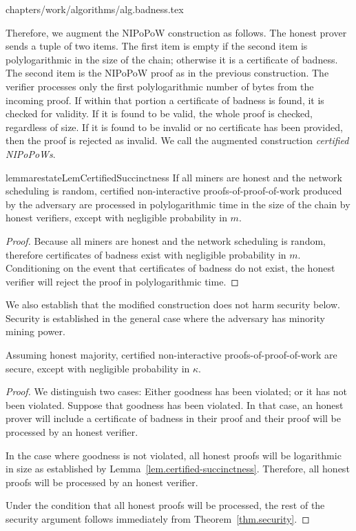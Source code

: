 {chapters/work/algorithms/alg.badness.tex}

Therefore, we augment the NIPoPoW construction as follows. The honest prover
sends a tuple of two items. The first item is empty if the second item is
polylogarithmic in the size of the chain; otherwise it is a certificate of
badness. The second item is the NIPoPoW proof as in the previous construction.
The verifier processes only the first polylogarithmic number of bytes from the
incoming proof. If within that portion a certificate of badness is found, it is
checked for validity. If it is found to be valid, the whole proof is checked,
regardless of size. If it is found to be invalid or no certificate has been
provided, then the proof is rejected as invalid. We call the augmented
construction \emph{certified NIPoPoWs}.

\begin{restatable}{lemma}{restateLemCertifiedSuccinctness}
    \label{lem.certified-succinctness}
    If all miners are honest and the network scheduling is random,
    certified non-interactive proofs-of-proof-of-work produced by the adversary
    are processed in polylogarithmic time in the size of the chain by honest
    verifiers, except with negligible probability in $m$.
\end{restatable}
\begin{proof}
    Because all miners are honest and the network scheduling is random,
    therefore certificates of badness exist with negligible probability in $m$.
    Conditioning on the event that certificates of badness do not exist, the
    honest verifier will reject the proof in polylogarithmic time.
\end{proof}

We also establish that the modified construction does not harm security below.
Security is established in the general case where the adversary has minority
mining power.

\begin{theorem}
    Assuming honest majority, certified non-interactive proofs-of-proof-of-work
    are secure, except with negligible probability in $\kappa$.
\end{theorem}
\begin{proof}
    We distinguish two cases: Either goodness has been violated; or it has not
    been violated. Suppose that goodness has been violated. In that case, an
    honest prover will include a certificate of badness in their proof and their
    proof will be processed by an honest verifier.

    In the case where goodness is not violated, all honest proofs will be
    logarithmic in size as established by
    Lemma~\ref{lem.certified-succinctness}. Therefore, all honest proofs will
    be processed by an honest verifier.

    Under the condition that all honest proofs will be processed, the rest of
    the security argument follows immediately from Theorem~\ref{thm.security}.
\end{proof}

